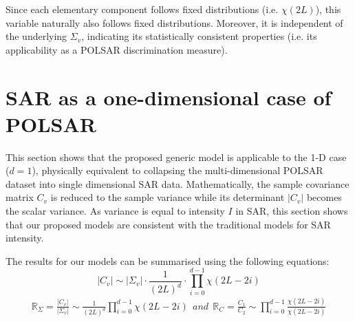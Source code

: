 \documentclass[printer]{tRSL2e}
\begin{document}
%
Since each elementary component follows fixed distributions (i.e. $\chi(2L)$),
this variable naturally also follows fixed distributions.
Moreover, it is independent of the underlying $\Sigma_v$,
  indicating its statistically consistent properties (i.e. its applicability as a POLSAR discrimination measure).

\section{SAR as a one-dimensional case of POLSAR}
\label{sec:sar_special_case_of_polsar}

This section shows that the proposed generic model is  applicable to the 1-D case ($d=1$),
physically equivalent to  collapsing the multi-dimensional POLSAR dataset  into single dimensional SAR data.
Mathematically, the sample covariance matrix $C_v$ is reduced to the sample variance while its determinant $|C_v|$ becomes the scalar variance.
As variance is equal to intensity $I$ in SAR,
  this section shows that our proposed models are consistent with the traditional models for SAR intensity.
  
The results for our models can be summarised using the following equations:
\begin{equation}\nonumber
  |C_v| \sim |\Sigma_v| \cdot \frac{1}{(2L)^d} \cdot \prod_{i=0}^{d-1} \chi (2L-2i) 
\end{equation}
\begin{eqnarray}\nonumber
\mathbb{R}_{\Sigma} = \frac{|C_v|}{|\Sigma_v|} \sim \frac{1}{(2L)^d} \prod^{d-1}_{i=0} \chi(2L-2i) ~~and~~
\mathbb{R}_{C} = \frac{C_1}{C_2} \sim \prod_{i=0}^{d-1} \frac{\chi(2L-2i)}{\chi(2L-2i)}
\end{eqnarray}
\end{document}
